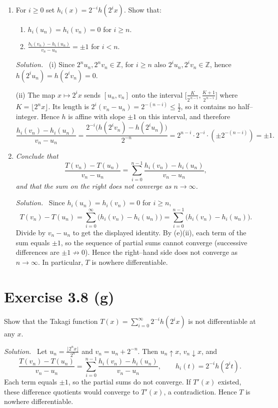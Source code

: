 \documentclass[11pt,a4paper]{article}
\newenvironment{solution}{\par\noindent\textit{Solution.}\ }{\par\vspace{0.5em}}
\begin{document}
\begin{enumerate}
	\item For $i\ge 0$ set $h_i(x)=2^{-i}h(2^i x)$. Show that:
	\begin{enumerate}
		\renewcommand\labelenumii{(\roman{enumii})}
		\item $h_i(u_n)=h_i(v_n)=0$ for $i\ge n$.
		\item $\displaystyle \frac{h_i(v_n)-h_i(u_n)}{v_n-u_n}=\pm 1$ for $i<n$.
	\end{enumerate}
	\begin{solution}
		(i) Since $2^n u_n,2^n v_n\in\mathbb{Z}$, for $i\ge n$ also $2^i u_n,2^i v_n\in\mathbb{Z}$, hence $h(2^i u_n)=h(2^i v_n)=0$.
		
		(ii) The map $x\mapsto 2^i x$ sends $[u_n,v_n]$ onto the interval
		$\big[\tfrac{K}{2^{\,n-i}},\tfrac{K+1}{2^{\,n-i}}\big]$ where $K= \lfloor 2^n x\rfloor$.
		Its length is $2^{i}(v_n-u_n)=2^{-(n-i)}\le \tfrac12$, so it contains no half--integer.
		Hence $h$ is affine with slope $\pm1$ on this interval, and therefore
		\[
		\frac{h_i(v_n)-h_i(u_n)}{v_n-u_n}=\frac{2^{-i}\big(h(2^i v_n)-h(2^i u_n)\big)}{2^{-n}}
		=2^{n-i}\cdot 2^{-i}\cdot (\pm 2^{-(n-i)})=\pm 1.
		\]
	\end{solution}
	
	\item \textit{Conclude that}
	\[
	\frac{T(v_n)-T(u_n)}{v_n-u_n}=\sum_{i=0}^{n-1}\frac{h_i(v_n)-h_i(u_n)}{v_n-u_n},
	\]
	\textit{and that the sum on the right does not converge as $n\to\infty$.}
	\begin{solution}
		Since $h_i(u_n)=h_i(v_n)=0$ for $i\ge n$,
		\[
		T(v_n)-T(u_n)=\sum_{i=0}^{\infty}\big(h_i(v_n)-h_i(u_n)\big)
		=\sum_{i=0}^{n-1}\big(h_i(v_n)-h_i(u_n)\big).
		\]
		Divide by $v_n-u_n$ to get the displayed identity. By (e)(ii), each term of the sum equals $\pm1$, so the
		sequence of partial sums cannot converge (successive differences are $\pm1\not\to 0$). Hence the right--hand side
		does not converge as $n\to\infty$. In particular, $T$ is nowhere differentiable.
	\end{solution}
\end{enumerate}

\section*{Exercise 3.8 (g)}
Show that the Takagi function $T(x)=\sum_{i=0}^{\infty}2^{-i}h(2^i x)$ is not differentiable at any $x$.

\begin{solution}
	Let $u_n=\frac{\lfloor 2^n x\rfloor}{2^n}$ and $v_n=u_n+2^{-n}$. Then $u_n\uparrow x$, $v_n\downarrow x$, and
	\[
	\frac{T(v_n)-T(u_n)}{v_n-u_n}=\sum_{i=0}^{n-1}\frac{h_i(v_n)-h_i(u_n)}{v_n-u_n},\qquad h_i(t)=2^{-i}h(2^i t).
	\]
	Each term equals $\pm1$, so the partial sums do not converge. If $T'(x)$ existed, these difference quotients
	would converge to $T'(x)$, a contradiction. Hence $T$ is nowhere differentiable.
\end{solution}
\end{document}
